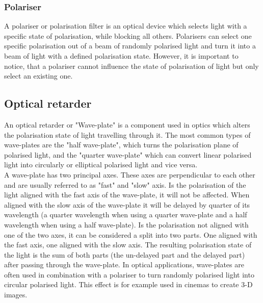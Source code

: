 \subsubsection{Polariser}
A polariser or polarisation filter is an optical device which selects light with a specific state of polarisation, while blocking all others. Polarisers can select one specific polarisation out of a beam of randomly polarised light and turn it into a beam of light with a defined polarisation state. However, it is important to notice, that a polariser cannot influence the state of polarisation of light but only select an existing one.\cite{hecht2002optics}

\subsection{Optical retarder}
An optical retarder or "Wave-plate" is a component used in optics which alters the polarisation state of light travelling through it. The most common types of wave-plates are the "half wave-plate", which turns the polarisation plane of polarised light, and the "quarter wave-plate" which can convert linear polarised light into circularly or elliptical polarised light and vice versa.\\
A wave-plate has two principal axes. These axes are perpendicular to each other and are usually referred to as "fast" and "slow" axis. Is the polarisation of the light aligned with the fast axis of the wave-plate, it will not be affected. When aligned with the slow axis of the wave-plate it will be delayed by quarter of its wavelength (a quarter wavelength when using a quarter wave-plate and a half wavelength when using a half wave-plate). Is the polarisation not aligned with one of the two axes, it can be considered a split into two parts. One aligned with the fast axis, one aligned with the slow axis. The resulting polarisation state of the light is the sum of both parts (the un-delayed part and the delayed part) after passing through the wave-plate. In optical applications, wave-plates are often used in combination with a polariser to turn randomly polarised light into circular polarised light. This effect is for example used in cinemas to create 3-D images.\cite{LoefflerLang2020}\cite{hecht2002optics}\cite{MITHalfWP}\cite{MITQuarterWP}


